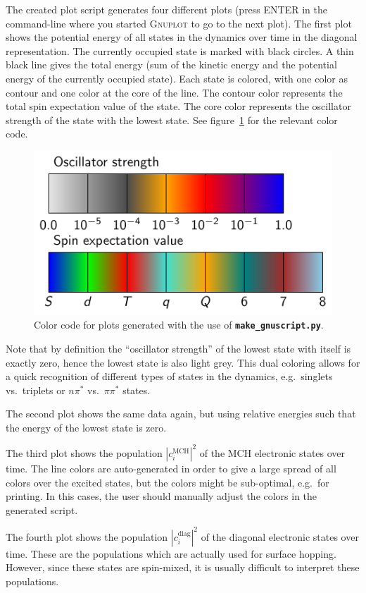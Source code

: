 \documentclass[a4paper,10pt,DIV=15,openany]{scrbook}
\newcommand{\ttt}[1]{\textbf{\texttt{#1}}}
\begin{document}
The created plot script generates four different plots (press ENTER in the command-line where you started \textsc{Gnuplot} to go to the next plot). The first plot shows the potential energy of all states in the dynamics over time in the diagonal representation. The currently occupied state is marked with black circles. A thin black line gives the total energy (sum of the kinetic energy and the potential energy of the currently occupied state). Each state is colored, with one color as contour and one color at the core of the line. The contour color represents the total spin expectation value of the state. The core color represents the oscillator strength of the state with the lowest state. See figure~\ref{fig:colors} for the relevant color code.
\begin{figure}
  \centering
  \includegraphics[scale=1]{img/colors/colors.pdf}
  \caption{Color code for plots generated with the use of \ttt{make\_gnuscript.py}.}
  \label{fig:colors}
\end{figure}
Note that by definition the ``oscillator strength'' of the lowest state with itself is exactly zero, hence the lowest state is also light grey. This dual coloring allows for a quick recognition of different types of states in the dynamics, e.g.\ singlets vs.\ triplets or $n\pi^*$ vs.\ $\pi\pi^*$ states.

The second plot shows the same data again, but using relative energies such that the energy of the lowest state is zero.

The third plot shows the population $|c_i^{\text{MCH}}|^2$ of the MCH electronic states over time. The line colors are auto-generated in order to give a large spread of all colors over the excited states, but the colors might be sub-optimal, e.g.\ for printing. In this cases, the user should manually adjust the colors in the generated script.

The fourth plot shows the population $|c_i^{\text{diag}}|^2$ of the diagonal electronic states over time. These are the populations which are actually used for surface hopping. However, since these states are spin-mixed, it is usually difficult to interpret these populations.
\end{document}
